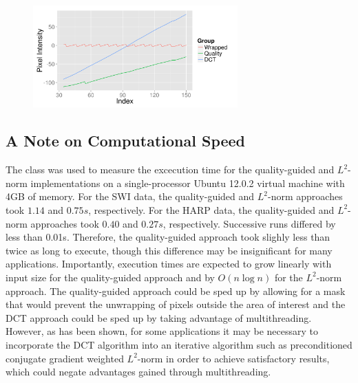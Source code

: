 \begin{figure}[h]
\center
{}
\includegraphics[width=0.70\textwidth]{images/harp/congruence.png}
\label{fig:HARP_Congruence}
\end{figure}

\subsection{A Note on Computational Speed}

The  class was used to measure the excecution time for the quality-guided and $L^2$-norm implementations on a single-processor Ubuntu 12.0.2 virtual machine with 4GB of memory.  For the SWI data, the quality-guided and $L^2$-norm approaches took $1.14$ and $0.75s$, respectively.  For the HARP data, the quality-guided and $L^2$-norm approaches took $0.40$ and $0.27s$, respectively.  Successive runs differed by less than 0.01s.  Therefore, the quality-guided approach took slighly less than twice as long to execute, though this difference may be insignificant for many applications.  Importantly, execution times are expected to grow linearly with input size for the quality-guided approach and by $O(n \log n)$ for the $L^2$-norm approach.  The quality-guided approach could be sped up by allowing for a mask that would prevent the unwrapping of pixels outside the area of interest and the DCT approach could be sped up by taking advantage of multithreading.  However, as has been shown, for some applications it may be necessary to incorporate the DCT algorithm into an iterative algorithm such as preconditioned conjugate gradient weighted $L^2$-norm in order to achieve satisfactory results, which could negate advantages gained through multithreading.
